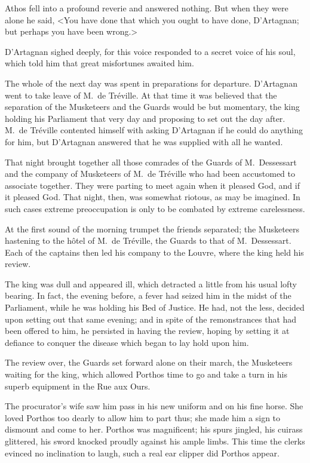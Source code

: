 Athos fell into a profound reverie and answered nothing. But when they were alone he said, <You have done that which you ought to have done, D'Artagnan; but perhaps you have been wrong.> 

D'Artagnan sighed deeply, for this voice responded to a secret voice of his soul, which told him that great misfortunes awaited him. 

The whole of the next day was spent in preparations for departure. D'Artagnan went to take leave of M.~de Tréville. At that time it was believed that the separation of the Musketeers and the Guards would be but momentary, the king holding his Parliament that very day and proposing to set out the day after. M.~de Tréville contented himself with asking D'Artagnan if he could do anything for him, but D'Artagnan answered that he was supplied with all he wanted. 

That night brought together all those comrades of the Guards of M.~Dessessart and the company of Musketeers of M.~de Tréville who had been accustomed to associate together. They were parting to meet again when it pleased God, and if it pleased God. That night, then, was somewhat riotous, as may be imagined. In such cases extreme preoccupation is only to be combated by extreme carelessness. 

At the first sound of the morning trumpet the friends separated; the Musketeers hastening to the hôtel of M.~de Tréville, the Guards to that of M.~Dessessart. Each of the captains then led his company to the Louvre, where the king held his review. 

The king was dull and appeared ill, which detracted a little from his usual lofty bearing. In fact, the evening before, a fever had seized him in the midst of the Parliament, while he was holding his Bed of Justice. He had, not the less, decided upon setting out that same evening; and in spite of the remonstrances that had been offered to him, he persisted in having the review, hoping by setting it at defiance to conquer the disease which began to lay hold upon him. 

The review over, the Guards set forward alone on their march, the Musketeers waiting for the king, which allowed Porthos time to go and take a turn in his superb equipment in the Rue aux Ours. 

The procurator's wife saw him pass in his new uniform and on his fine horse. She loved Porthos too dearly to allow him to part thus; she made him a sign to dismount and come to her. Porthos was magnificent; his spurs jingled, his cuirass glittered, his sword knocked proudly against his ample limbs. This time the clerks evinced no inclination to laugh, such a real ear clipper did Porthos appear. 

